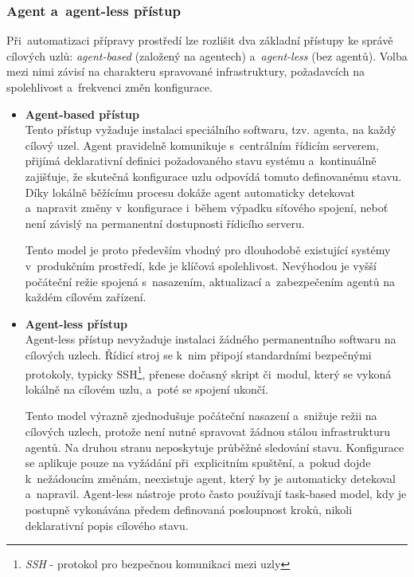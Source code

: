 \subsubsection{Agent a~agent-less přístup}
Při~automatizaci přípravy prostředí lze rozlišit dva základní přístupy ke správě cílových uzlů: \textit{agent-based} (založený na agentech) a~\textit{agent-less} (bez agentů). 
Volba mezi nimi závisí na charakteru spravované infrastruktury, požadavcích na spolehlivost a~frekvenci změn konfigurace.
\begin{itemize}
    \item \textbf{Agent-based přístup} \\
    Tento přístup vyžaduje instalaci speciálního softwaru, tzv. agenta, na každý cílový uzel.
    Agent pravidelně komunikuje s~centrálním řídicím serverem, přijímá deklarativní definici požadovaného stavu systému a~kontinuálně zajišťuje, že skutečná konfigurace uzlu odpovídá tomuto definovanému stavu. 
    Díky lokálně běžícímu procesu dokáže agent automaticky detekovat a~napravit změny v~konfigurace i~během výpadku síťového spojení, neboť není závislý na permanentní dostupnosti řídicího serveru.
    \cite{puppetagent}

    Tento model je proto především vhodný pro dlouhodobě existující systémy v~produkčním prostředí, kde je klíčová spolehlivost. 
    Nevýhodou je vyšší počáteční režie spojená s~nasazením, aktualizací a~zabezpečením agentů na každém cílovém zařízení. 
    \cite{puppetagent}
    \item \textbf{Agent-less přístup} \\
    Agent-less přístup nevyžaduje instalaci žádného permanentního softwaru na cílových uzlech. 
    Řídicí stroj se k~nim připojí standardními bezpečnými protokoly, typicky SSH\footnote{\textit{SSH} - protokol pro bezpečnou komunikaci mezi uzly}, přenese dočasný skript či~modul, který se vykoná lokálně na cílovém uzlu, a~poté se spojení ukončí. 
    \cite{puppetagent}

    Tento model výrazně zjednodušuje počáteční nasazení a~snižuje režii na cílových uzlech, protože není nutné spravovat žádnou stálou infrastrukturu agentů. 
    Na druhou stranu neposkytuje průběžné sledování stavu. 
    Konfigurace se aplikuje pouze na vyžádání při~explicitním spuštění, a~pokud dojde k~nežádoucím změnám, neexistuje agent, který by je automaticky detekoval a~napravil. 
    Agent-less nástroje proto často používají task-based model, kdy je postupně vykonávána předem definovaná posloupnost kroků, nikoli deklarativní popis cílového stavu. 
    \cite{puppetagent}
\end{itemize}


